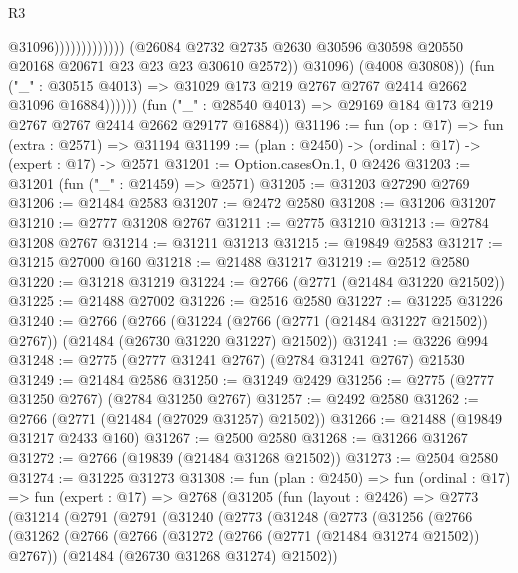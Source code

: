\begin{lexlean}{R3}
\begin{coremodule}
                                                @31096)))))))))))))
                      (@26084
                        @2732
                        @2735
                        @2630
                        @30596
                        @30598
                        @20550
                        @20168
                        @20671
                        @23
                        @23
                        @23
                        @30610
                        @2572))
                    @31096)
                  (@4008 @30808))
                (fun ("_" : @30515 @4013) =>
                @31029 @173 @219 @2767 @2767 @2414 @2662 @31096 @16884))))))
      (fun ("_" : @28540 @4013) => @29169 @184 @173 @219 @2767 @2767 @2414 @2662 @29177 @16884))
@31196 := fun (op : @17) => fun (extra : @2571) => @31194
@31199 := (plan : @2450) -> (ordinal : @17) -> (expert : @17) -> @2571
@31201 := Option.casesOn.{1, 0} @2426
@31203 := @31201 (fun ("_" : @21459) => @2571)
@31205 := @31203 @27290 @2769
@31206 := @21484 @2583
@31207 := @2472 @2580
@31208 := @31206 @31207
@31210 := @2777 @31208 @2767
@31211 := @2775 @31210
@31213 := @2784 @31208 @2767
@31214 := @31211 @31213
@31215 := @19849 @2583
@31217 := @31215 @27000 @160
@31218 := @21488 @31217
@31219 := @2512 @2580
@31220 := @31218 @31219
@31224 := @2766 (@2771 (@21484 @31220 @21502))
@31225 := @21488 @27002
@31226 := @2516 @2580
@31227 := @31225 @31226
@31240 := @2766
    (@2766
      (@31224 (@2766 (@2771 (@21484 @31227 @21502)) @2767))
      (@21484 (@26730 @31220 @31227) @21502))
@31241 := @3226 @994
@31248 := @2775 (@2777 @31241 @2767) (@2784 @31241 @2767) @21530
@31249 := @21484 @2586
@31250 := @31249 @2429
@31256 := @2775 (@2777 @31250 @2767) (@2784 @31250 @2767)
@31257 := @2492 @2580
@31262 := @2766 (@2771 (@21484 (@27029 @31257) @21502))
@31266 := @21488 (@19849 @31217 @2433 @160)
@31267 := @2500 @2580
@31268 := @31266 @31267
@31272 := @2766 (@19839 (@21484 @31268 @21502))
@31273 := @2504 @2580
@31274 := @31225 @31273
@31308 := fun (plan : @2450) =>
  fun (ordinal : @17) =>
  fun (expert : @17) =>
  @2768
    (@31205
      (fun (layout : @2426) =>
      @2773
        (@31214
          (@2791
            (@2791
              (@31240
                (@2773
                  (@31248
                    (@2773
                      (@31256
                        (@2766
                          (@31262
                            (@2766
                              (@2766
                                (@31272 (@2766 (@2771 (@21484 @31274 @21502)) @2767))
                                (@21484 (@26730 @31268 @31274) @21502))

\end{coremodule}
\end{lexlean}

